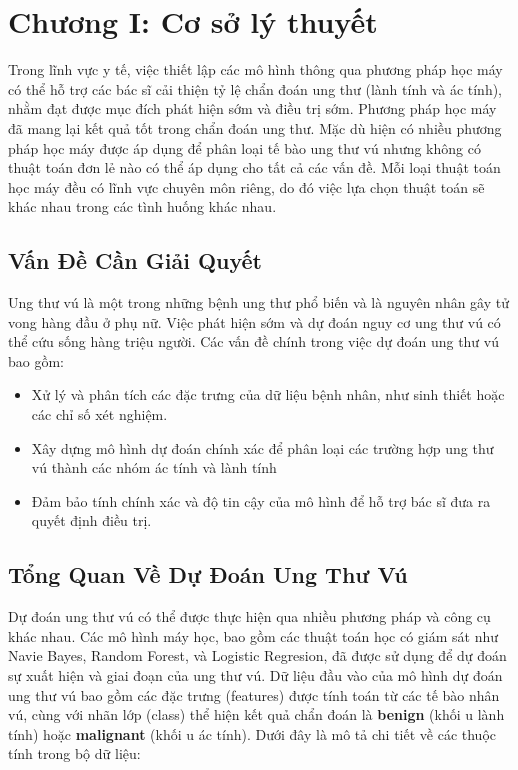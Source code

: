 \section{Chương I: Cơ sở lý thuyết}
Trong lĩnh vực y tế, việc thiết lập các mô hình thông qua phương pháp học máy có thể hỗ trợ các bác sĩ cải thiện tỷ lệ chẩn đoán ung thư (lành tính và ác tính), nhằm đạt được mục đích phát hiện sớm và điều trị sớm. Phương pháp học máy đã mang lại kết quả tốt trong chẩn đoán ung thư. Mặc dù hiện có nhiều phương pháp học máy được áp dụng để phân loại tế bào ung thư vú nhưng không có thuật toán đơn lẻ nào có thể áp dụng cho tất cả các vấn đề. Mỗi loại thuật toán học máy đều có lĩnh vực chuyên môn riêng, do đó việc lựa chọn thuật toán sẽ khác nhau trong các tình huống khác nhau.
\subsection{Vấn Đề Cần Giải Quyết}
Ung thư vú là một trong những bệnh ung thư phổ biến và là nguyên nhân gây tử vong hàng đầu ở phụ nữ. Việc phát hiện sớm và dự đoán nguy cơ ung thư vú có thể cứu sống hàng triệu người. Các vấn đề chính trong việc dự đoán ung thư vú bao gồm:
\begin{itemize}
    \item {} Xử lý và phân tích các đặc trưng của dữ liệu bệnh nhân, như sinh thiết hoặc các chỉ số xét nghiệm.
    \item {}Xây dựng mô hình dự đoán chính xác để phân loại các trường hợp ung thư vú thành các nhóm ác tính và lành tính
    \item {} Đảm bảo tính chính xác và độ tin cậy của mô hình để hỗ trợ bác sĩ đưa ra quyết định điều trị.
\end{itemize}
\subsection{Tổng Quan Về Dự Đoán Ung Thư Vú}
Dự đoán ung thư vú có thể được thực hiện qua nhiều phương pháp và công cụ khác nhau. Các mô hình máy học, bao gồm các thuật toán học có giám sát như Navie Bayes, Random Forest, và Logistic Regresion, đã được sử dụng để dự đoán sự xuất hiện và giai đoạn của ung thư vú. Dữ liệu đầu vào của mô hình dự đoán ung thư vú bao gồm các đặc trưng (features) được tính toán từ các tế bào nhân vú, cùng với nhãn lớp (class) thể hiện kết quả chẩn đoán là \textbf{benign} (khối u lành tính) hoặc \textbf{malignant} (khối u ác tính). Dưới đây là mô tả chi tiết về các thuộc tính trong bộ dữ liệu:


